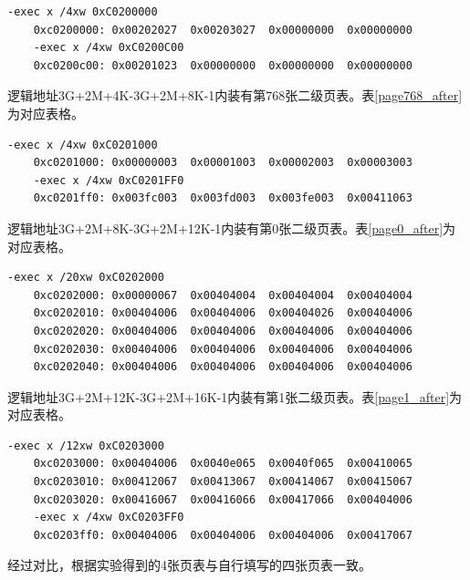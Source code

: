 \begin{Verbatim}[frame=single,fontsize=\small]
    -exec x /4xw 0xC0200000
    0xc0200000:	0x00202027	0x00203027	0x00000000	0x00000000
    -exec x /4xw 0xC0200C00
    0xc0200c00:	0x00201023	0x00000000	0x00000000	0x00000000
\end{Verbatim}
\label{relative_directory}

逻辑地址3G+2M+4K-3G+2M+8K-1内装有第768张二级页表。表\ref{page768_after}为对应表格。

\begin{Verbatim}[frame=single,fontsize=\small]
    -exec x /4xw 0xC0201000
    0xc0201000:	0x00000003	0x00001003	0x00002003	0x00003003
    -exec x /4xw 0xC0201FF0
    0xc0201ff0:	0x003fc003	0x003fd003	0x003fe003	0x00411063
\end{Verbatim}
\label{mem768}

逻辑地址3G+2M+8K-3G+2M+12K-1内装有第0张二级页表。表\ref{page0_after}为对应表格。

\begin{Verbatim}[frame=single,fontsize=\small]
    -exec x /20xw 0xC0202000
    0xc0202000:	0x00000067	0x00404004	0x00404004	0x00404004
    0xc0202010:	0x00404006	0x00404006	0x00404026	0x00404006
    0xc0202020:	0x00404006	0x00404006	0x00404006	0x00404006
    0xc0202030:	0x00404006	0x00404006	0x00404006	0x00404006
    0xc0202040:	0x00404006	0x00404006	0x00404006	0x00404006
\end{Verbatim}
\label{mem0}

逻辑地址3G+2M+12K-3G+2M+16K-1内装有第1张二级页表。表\ref{page1_after}为对应表格。

\begin{Verbatim}[frame=single,fontsize=\small]
    -exec x /12xw 0xC0203000
    0xc0203000:	0x00404006	0x0040e065	0x0040f065	0x00410065
    0xc0203010:	0x00412067	0x00413067	0x00414067	0x00415067
    0xc0203020:	0x00416067	0x00416066	0x00417066	0x00404006    
    -exec x /4xw 0xC0203FF0
    0xc0203ff0:	0x00404006	0x00404006	0x00404006	0x00417067
\end{Verbatim}
\label{mem1}

经过对比，根据实验得到的4张页表与自行填写的四张页表一致。